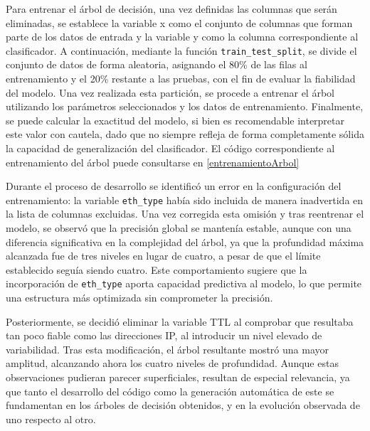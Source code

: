 Para entrenar el árbol de decisión, una vez definidas las columnas que serán eliminadas, se establece la variable x como el conjunto de columnas que forman parte de los datos de entrada y la variable y como la columna correspondiente al clasificador. A continuación, mediante la función \verb|train_test_split|, se divide el conjunto de datos de forma aleatoria, asignando el 80\% de las filas al entrenamiento y el 20\% restante a las pruebas, con el fin de evaluar la fiabilidad del modelo. Una vez realizada esta partición, se procede a entrenar el árbol utilizando los parámetros seleccionados y los datos de entrenamiento. Finalmente, se puede calcular la exactitud del modelo, si bien es recomendable interpretar este valor con cautela, dado que no siempre refleja de forma completamente sólida la capacidad de generalización del clasificador. El código correspondiente al entrenamiento del árbol puede consultarse en \ref{entrenamientoArbol}

Durante el proceso de desarrollo se identificó un error en la configuración del entrenamiento: la variable \verb|eth_type| había sido incluida de manera inadvertida en la lista de columnas excluidas. Una vez corregida esta omisión y tras reentrenar el modelo, se observó que la precisión global se mantenía estable, aunque con una diferencia significativa en la complejidad del árbol, ya que la profundidad máxima alcanzada fue de tres niveles en lugar de cuatro, a pesar de que el límite establecido seguía siendo cuatro. Este comportamiento sugiere que la incorporación de \verb|eth_type| aporta capacidad predictiva al modelo, lo que permite una estructura más optimizada sin comprometer la precisión.

Posteriormente, se decidió eliminar la variable TTL al comprobar que resultaba tan poco fiable como las direcciones IP, al introducir un nivel elevado de variabilidad. Tras esta modificación, el árbol resultante mostró una mayor amplitud, alcanzando ahora los cuatro niveles de profundidad. Aunque estas observaciones pudieran parecer superficiales, resultan de especial relevancia, ya que tanto el desarrollo del código como la generación automática de este se fundamentan en los árboles de decisión obtenidos, y en la evolución observada de uno respecto al otro.



